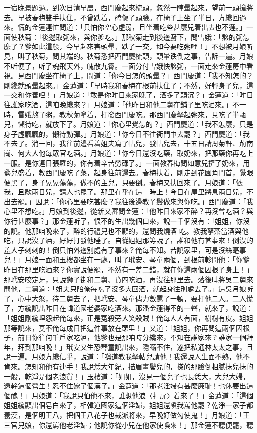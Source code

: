 \begin{showcontents}{}
一宿晚景題過。到次日清早晨，西門慶起來梳頭，忽然一陣暈起來，望前一頭搶將去。早被春梅雙手扶住，不曾跌着，磕傷了頭臉。在椅子上坐了半日，方纔回過來。慌的金蓮連忙問道：「只怕你空心虛弱，且坐着吃些甚麼兒着出去也不遲。」一面使秋菊：「後邊取粥來，與你爹吃。」那秋菊走到後邊廚下，問雪娥：「熬的粥怎麼了？爹如此這般，今早起來害頭暈，跌了一交，如今要吃粥哩！」不想被月娘听見，叫了秋菊，問其端的。秋菊悉把西門慶梳頭，頭暈跌倒之事，告訴一遍。月娘不听便了，听了魂飛天外，魄散九霄。一面分付雪娥快熬粥，一面走來金蓮房中看視。見西門慶坐在椅子上，問道：「你今日怎的頭暈？」西門慶道：「我不知怎的？剛纔就頭暈起來。」金蓮道：「早時我和春梅在根前扶住了；不然，好輕身子兒，這一交和你善哩！」月娘道：「敢是你昨日來家晚了，酒多了頭沉？」金蓮道：「昨日往誰家吃酒，這咱晚纔來？」月娘道：「他昨日和他二舅在鋪子里吃酒來。」不一時，雪娥熬了粥，教秋菊拿着，打發西門慶吃。那西門慶拏起粥來，只吃了半甌兒，懶待吃，就放下了。月娘道：「你心里覺怎的？」西門慶道：「我不怎麼，只是身子虛飄飄的，懶待動彈。」月娘道：「你今日不往衙門中去罷？」西門慶道：「我不去了。消一回，我往前邊看着姐夫寫了帖兒，發帖兒去，十五日請周菊軒、荊南崗、何大人他每眾官吃酒。」月娘道：「你今日還沒吃藥，取奶來，把那藥你再吃上一服。是你連日張羅的，你有着辛苦勞碌了。」一面教春梅問如意兒擠了奶來，用盞兒盛着，教西門慶吃了藥，起身往前邊去。春梅扶着，剛走到花園角門首，覺眼便黑了，身子晃晃蕩蕩，做不的主兒，只要倒。春梅又扶回來了。月娘道：「依我，且歇兩日兒，請人也罷了。那里在乎在這一時上！今日在屋里將息兩日兒，不出去罷。」因說：「你心里要吃甚麼？我往後邊教丫鬟做來與你吃。」西門慶道：「我心里不想吃。」月娘到後邊，從新又審問金蓮：「他昨日來家不醉？再沒曾吃酒？與你行甚麼事？」那金蓮听了，恨不的生出幾個口來，說一千個沒有：「姐姐，你沒的說。他那咱晚來了，醉的行禮兒也不顧的，還問我燒酒 吃。教我拏茶當酒與他吃，只說沒了酒，好好打發他睡了。自從姐姐那等說了，誰和他有甚事來！倒沒的羞人子刺刺的！倒只怕外邊別處有了事來？俺每不知。若說家里，可是沒絲亳事兒！」月娘一面和玉樓都坐在一處，叫了玳安、琴童兩個，到根前軫問他：「你爹昨日在那里吃酒來？你實說便罷，不然有一差二錯，就在你這兩個囚根子身上！」那玳安咬定牙，只說獅子街和二舅、賁四吃酒，再沒往那里去。落後叫將吳二舅來問他，二舅道：「姐夫只陪俺每吃了沒多大回酒，就起身往別處去了。」這吳月娘听了，心中大怒，待二舅去了，把玳安、琴童儘力數罵了一頓，要打他二人。二人慌了，方纔說出昨日在韓道國老婆家吃酒來。那潘金蓮得不的一聲，就來了，說道：「姐姐剛纔埋怨起俺每來，正是冤殺旁人笑殺賊！俺每人人有面，樹樹有皮。姐姐那等說來，莫不俺每成日把這件事放在頭里！」又道：「姐姐，你再問這兩個囚根子，前日你往何千戶家吃酒，他爹也是那咱時分纔來，不知在誰家來？誰家一個拜年，拜到那咱晚！」玳安又生恐琴童說出來，隱瞞不住，遂把私通林太太之事，且說一遍。月娘方纔信乎，說道：「嗔道教我拏帖兒請他！我還說人生面不熟，他不肯來。怎知和他有連手！我說恁大年紀，描眉畫鬢兒的，搽的那臉倒相膩抹兒抹的一般，乾淨是個老浪貨！」玉樓道：「姐姐，沒見一個兒子也長恁大，大兒大婦，還幹這個營生！忍不住嫁了個漢子。」金蓮道：「那老淫婦有甚麼廉耻！也休要出這個醜！」月娘道：「我說只怕他不來，誰想他浪〈扌扉〉着來了！」金蓮道：「這個姐姐纔顯出個皂白來了，相韓道國家這個淫婦，姐姐還嗔我罵他罷？乾淨一家子都養漢，是個明王八，把個王八花子也裁派將來，早晚好做勾使鬼！」月娘道：「王三官兒娘，你還罵他老淫婦；他說你從小兒在他家使喚來！」那金蓮不聽便罷，聽
\end{showcontents}
